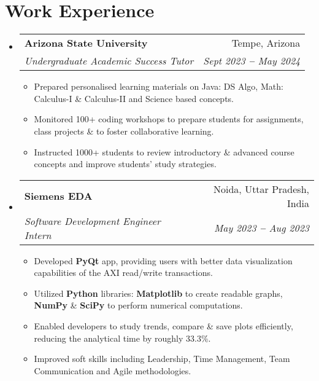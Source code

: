 \documentclass[letterpaper,11pt]{article}
\makeatletter
\newcommand{\resumeItem}[1]{
  \item\small{
    {#1 \vspace{-2pt}}
  }
}
\newcommand{\resumeSubheading}[4]{
  \vspace{-2pt}\item
    \begin{tabular*}{0.97\textwidth}[t]{l@{\extracolsep{\fill}}r}
      \textbf{#1} & #2 \\
      \textit{\small#3} & \textit{\small #4} \\
    \end{tabular*}\vspace{-7pt}
}
\newcommand{\resumeSubHeadingListStart}{\begin{itemize}[leftmargin=0.15in, label={}]}
\newcommand{\resumeSubHeadingListEnd}{\end{itemize}}
\newcommand{\resumeItemListStart}{\begin{itemize}[leftmargin=0.2in]}
\newcommand{\resumeItemListEnd}{\end{itemize}\vspace{-5pt}}
\makeatother
\begin{document}

\section{Work Experience}
  \resumeSubHeadingListStart

    \resumeSubheading
      {Arizona State University}{Tempe, Arizona}
      {Undergraduate Academic Success Tutor}{Sept 2023 \textbf{--} May 2024}
        \resumeItemListStart
          \resumeItem{Prepared personalised learning materials on Java: DS Algo, Math: Calculus-I \& Calculus-II and Science based concepts.}
          \resumeItem{Monitored 100+ coding workshops to prepare students for assignments, class projects \& to foster collaborative learning.}
          \resumeItem{Instructed 1000+ students to review introductory \& advanced course concepts and improve students' study strategies.}
        \resumeItemListEnd

    \resumeSubheading
      {Siemens EDA}{Noida, Uttar Pradesh, India}
      {Software Development Engineer Intern}{May 2023 \textbf{--} Aug 2023}
        \resumeItemListStart
          \resumeItem{Developed \textbf{PyQt} app, providing users with better data visualization capabilities of the AXI read/write transactions.}
          \resumeItem{Utilized \textbf{Python} libraries: \textbf{Matplotlib} to create readable graphs, \textbf{NumPy} \& \textbf{SciPy} to perform numerical computations.}
          \resumeItem{Enabled developers to study trends, compare \& save plots efficiently, reducing the analytical time by roughly 33.3\%.}
          \resumeItem{Improved soft skills including Leadership, Time Management, Team Communication and Agile methodologies.}
        \resumeItemListEnd

  \resumeSubHeadingListEnd
\end{document}
